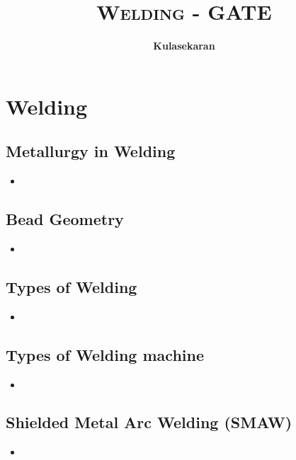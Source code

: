 \documentclass[8pt]{report}
\title{\Huge{\textsc{Welding - GATE}}}
\author{\huge{\textbf{Kulasekaran}}}
\begin{document}
\maketitle
\tableofcontents
\chapter{Welding}
\section{Metallurgy in Welding}
	\begin{itemize}
		\item
	\end{itemize}\hrulefill
\section{Bead Geometry}
	\begin{itemize}
		\item
	\end{itemize}\hrulefill
\section{Types of Welding}
	\begin{itemize}
		\item
	\end{itemize}\hrulefill
\section{Types of Welding machine}
	\begin{itemize}
		\item
	\end{itemize}\hrulefill
\section{Shielded Metal Arc Welding (SMAW)}
	\begin{itemize}
		\item
	\end{itemize}\hrulefill
\end{document}
